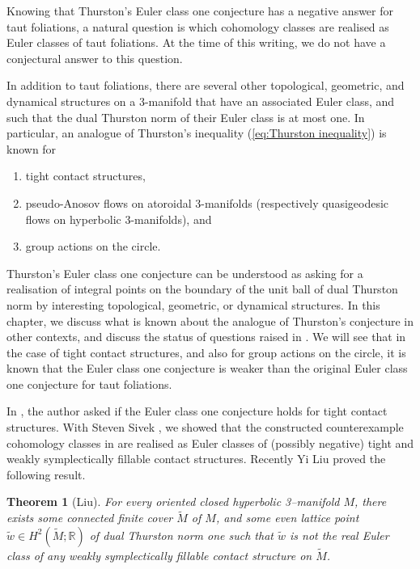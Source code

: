 \documentclass[11pt]{amsart}
\newtheorem{thm}{Theorem}[section]
\theoremstyle{remark}
\theoremstyle{definition}
\begin{document}
 	Knowing that Thurston's Euler class one conjecture has a negative answer for taut foliations, a natural question is which cohomology classes are realised as Euler classes of taut foliations. At the time of this writing, we do not have a conjectural answer to this question. 
 	
 	In addition to taut foliations, there are several other topological, geometric, and dynamical structures on a 3-manifold that have an associated Euler class, and such that the dual Thurston norm of their Euler class is at most one. In particular, an analogue of Thurston's inequality (\ref{eq:Thurston inequality}) is known for 
 	\begin{enumerate}
 		\item[a)] tight contact structures, 
 		\item[b)] pseudo-Anosov flows on atoroidal 3-manifolds (respectively quasigeodesic flows on hyperbolic 3-manifolds), and
 		\item[c)] group actions on the circle.
 	\end{enumerate}
	
	Thurston's Euler class one conjecture can be understood as asking for a realisation of integral points on the boundary of the unit ball of dual Thurston norm by interesting topological, geometric, or dynamical structures. In this chapter, we discuss what is known about the analogue of Thurston's conjecture in other contexts, and discuss the status of questions raised in \cite{yazdi2020thurston}. We will see that in the case of tight contact structures, and also for group actions on the circle, it is known that the Euler class one conjecture is weaker than the original Euler class one conjecture for taut foliations. 
	
	In \cite{yazdi2020thurston}, the author asked if the Euler class one conjecture holds for tight contact structures. With Steven Sivek \cite{sivek2023thurston}, we showed that the constructed counterexample cohomology classes in \cite{yazdi2020thurston} are realised as Euler classes of (possibly negative) tight and weakly symplectically fillable contact structures. Recently Yi Liu \cite{liu2024euler} proved the following result. 
	
	\begin{thm}[Liu]
		For every oriented closed hyperbolic 3–manifold $M$, there exists some connected finite cover $\tilde{M}$ of $M$, and some even lattice point $\tilde{w} \in H^2(\tilde{M}; \mathbb{R})$ of dual Thurston norm one such that $\tilde{w}$ is not the real Euler class of any weakly symplectically fillable contact structure on $\tilde{M}$.
		\label{thm:Liu-contact}
	\end{thm}
	
\end{document}
